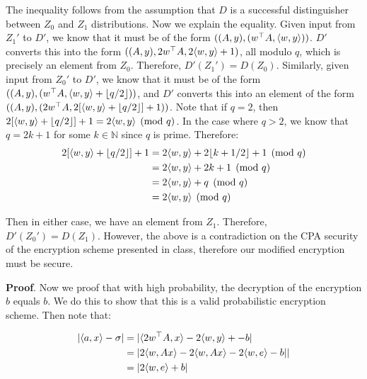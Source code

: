 \documentclass{article}
\begin{document}
\begin{enumerate}[,start=5]
\begin{itemize}
The inequality follows from the assumption that $D$ is a successful distinguisher between $Z_0$ and
$Z_1$ distributions. Now we explain the equality. Given input from $Z_1'$ to $D'$, we know that
it must be of the form $((A,y), (w^\top A, \langle w,y \rangle))$. $D'$ converts this into the form
$((A,y), 2w^\top A, 2\langle w,y \rangle + 1)$, all modulo $q$, which is precisely an element from $Z_0$.
Therefore, $D'(Z_1') = D(Z_0)$. Similarly, given input from $Z_0'$ to $D'$, we know that
it must be of the form $((A,y), (w^\top A, \langle w,y \rangle + \lfloor q/2 \rfloor))$, and $D'$ converts
this into an element of the form $((A,y), (2w^\top A, 2[\langle w,y \rangle + \lfloor q/2 \rfloor] + 1))$. Note that
if $q = 2$, then $2[\langle w,y \rangle + \lfloor q/2 \rfloor] + 1 = 2\langle w,y \rangle \pmod q$. In the case
where $q > 2$, we know that $q = 2k + 1$ for some $k \in \mathbb{N}$ since $q$ is prime. Therefore:%
\noindent\noindent\[%
\begin{aligned}
2[\iprod{w,y} + \lfloor q/2 \rfloor] + 1 &= 2\iprod{w,y} + 2\lfloor k +  1/2 \rfloor + 1 \pmod{q}\\
&= 2\iprod{w,y} + 2k + 1 \pmod{q} \\
&= 2\iprod{w,y} + q \pmod{q} \\
&= 2\iprod{w,y} \pmod{q}
\end{aligned}
\]%

Then in either case, we have an element from $Z_1$. Therefore, $D'(Z_0') = D(Z_1)$. However,
the above is a contradiction on the CPA security of the encryption scheme presented in class, 
therefore our modified encryption must be secure.%

\begin{mdbmarginx}{1ex}{0pt}{1ex}{0pt}%
\noindent{}\textbf{Proof}.  Now we proof that with high probability, the decryption of the encryption $b$ equals $b$. We do 
this to show that this is a valid probabilistic encryption scheme. Then note that:%
\end{mdbmarginx}%
\noindent\noindent\[%
\begin{aligned}
|\iprod{a,x} - \sigma| &= |\iprod{2w^\top A, x}- 2\iprod{w,y} +- b| \\
&= |2\iprod{w,Ax} - 2\iprod{w,Ax} - 2\iprod{w,e} - b|| \\
&= |2\iprod{w,e} + b| 
\end{aligned}
\]%


\end{itemize}
\end{enumerate}
\end{document}

